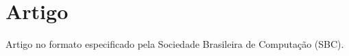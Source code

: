 \chapter{Artigo}

\noindent Artigo no formato especificado pela Sociedade Brasileira de Computação (SBC). %


